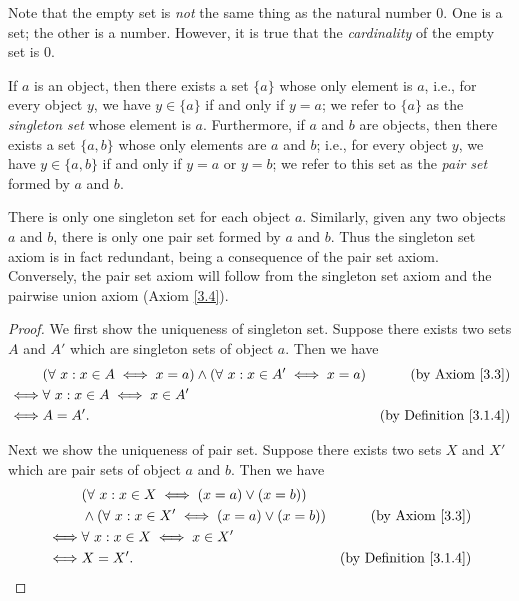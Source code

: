 \begin{remark}\label{3.1.8}
Note that the empty set is \emph{not} the same thing as the natural number \(0\).
One is a set;
the other is a number.
However, it is true that the \emph{cardinality} of the empty set is \(0\).
\end{remark}

\begin{axiom}\label{3.3}
If \(a\) is an object, then there exists a set \(\{a\}\) whose only element is \(a\), i.e., for every object \(y\), we have \(y \in \{a\}\) if and only if \(y = a\);
we refer to \(\{a\}\) as the \emph{singleton set} whose element is \(a\).
Furthermore, if \(a\) and \(b\) are objects, then there exists a set \(\{a, b\}\) whose only elements are \(a\) and \(b\);
i.e., for every object \(y\), we have \(y \in \{a, b\}\) if and only if \(y = a\) or \(y = b\);
we refer to this set as the \emph{pair set} formed by \(a\) and \(b\).
\end{axiom}

\begin{remark}\label{3.1.9}
There is only one singleton set for each object \(a\).
Similarly, given any two objects \(a\) and \(b\), there is only one pair set formed by \(a\) and \(b\).
Thus the singleton set axiom is in fact redundant, being a consequence of the pair set axiom.
Conversely, the pair set axiom will follow from the singleton set axiom and the pairwise union axiom (Axiom \ref{3.4}).
\end{remark}

\begin{proof}
We first show the uniqueness of singleton set.
Suppose there exists two sets \(A\) and \(A'\) which are singleton sets of object \(a\).
Then we have
\begin{align*}
& (\forall\ x : x \in A \iff x = a) \land (\forall\ x : x \in A' \iff x = a) & \text{(by Axiom \ref{3.3})} \\
\iff & \forall\ x : x \in A \iff x \in A' \\
\iff & A = A'. & \text{(by Definition \ref{3.1.4})}
\end{align*}

Next we show the uniqueness of pair set.
Suppose there exists two sets \(X\) and \(X'\) which are pair sets of object \(a\) and \(b\).
Then we have
\begin{align*}
& (\forall\ x : x \in X \iff (x = a) \lor (x = b)) \\
& \land (\forall\ x : x \in X' \iff (x = a) \lor (x = b)) & \text{(by Axiom \ref{3.3})} \\
\iff & \forall\ x : x \in X \iff x \in X' \\
\iff & X = X'. & \text{(by Definition \ref{3.1.4})}
\end{align*}
\end{proof}


